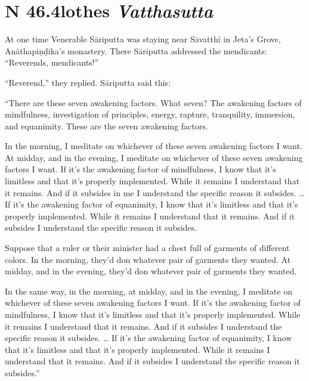 \documentclass[12pt,openany]{book}%
\newcommand*{\suttatitleacronym}[1]{\smaller[2]{#1}\vspace*{.3em}}
\newcommand*{\suttatitletranslation}[1]{\linebreak{#1}}
\newcommand*{\suttatitleroot}[1]{\linebreak\smaller[2]\itshape{#1}}
\newcommand*{\tocacronym}[1]{\hspace*{-3.3em}{#1}\quad}
\newcommand*{\toctranslation}[1]{#1}
\newcommand*{\tocroot}[1]{(\textit{#1})}
\begin{document}
%
\section*{{\suttatitleacronym SN 46.4}{\suttatitletranslation Clothes }{\suttatitleroot Vatthasutta}}
\addcontentsline{toc}{section}{\tocacronym{SN 46.4} \toctranslation{Clothes } \tocroot{Vatthasutta}}

At one time Venerable \textsanskrit{Sāriputta} was staying near \textsanskrit{Sāvatthī} in Jeta’s Grove, \textsanskrit{Anāthapiṇḍika}’s monastery. There \textsanskrit{Sāriputta} addressed the mendicants: “Reverends, mendicants!” 

“Reverend,” they replied. \textsanskrit{Sāriputta} said this: 

“There are these seven awakening factors. What seven? The awakening factors of mindfulness, investigation of principles, energy, rapture, tranquility, immersion, and equanimity. These are the seven awakening factors. 

In the morning, I meditate on whichever of these seven awakening factors I want. At midday, and in the evening, I meditate on whichever of these seven awakening factors I want. If it’s the awakening factor of mindfulness, I know that it’s limitless and that it’s properly implemented. While it remains I understand that it remains. And if it subsides in me I understand the specific reason it subsides. … If it’s the awakening factor of equanimity, I know that it’s limitless and that it’s properly implemented. While it remains I understand that it remains. And if it subsides I understand the specific reason it subsides. 

Suppose that a ruler or their minister had a chest full of garments of different colors. In the morning, they’d don whatever pair of garments they wanted. At midday, and in the evening, they’d don whatever pair of garments they wanted. 

In the same way, in the morning, at midday, and in the evening, I meditate on whichever of these seven awakening factors I want. If it’s the awakening factor of mindfulness, I know that it’s limitless and that it’s properly implemented. While it remains I understand that it remains. And if it subsides I understand the specific reason it subsides. … If it’s the awakening factor of equanimity, I know that it’s limitless and that it’s properly implemented. While it remains I understand that it remains. And if it subsides I understand the specific reason it subsides.” 
\end{document}
